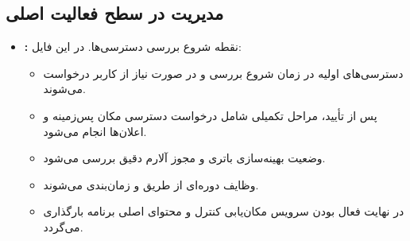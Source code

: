 \subsection{مدیریت در سطح فعالیت اصلی}
\begin{itemize}
    \item \textbf{:}  
    نقطه شروع بررسی دسترسی‌ها. در این فایل:
    \begin{itemize}
        \item دسترسی‌های اولیه در زمان شروع بررسی و در صورت نیاز از کاربر درخواست می‌شوند.
        \item پس از تأیید، مراحل تکمیلی شامل درخواست دسترسی مکان پس‌زمینه و اعلان‌ها انجام می‌شود.
        \item وضعیت بهینه‌سازی باتری و مجوز آلارم دقیق بررسی می‌شود.
        \item وظایف دوره‌ای از طریق  و  زمان‌بندی می‌شوند.
        \item در نهایت فعال بودن سرویس مکان‌یابی کنترل و محتوای اصلی برنامه بارگذاری می‌گردد.
    \end{itemize}
\end{itemize}

